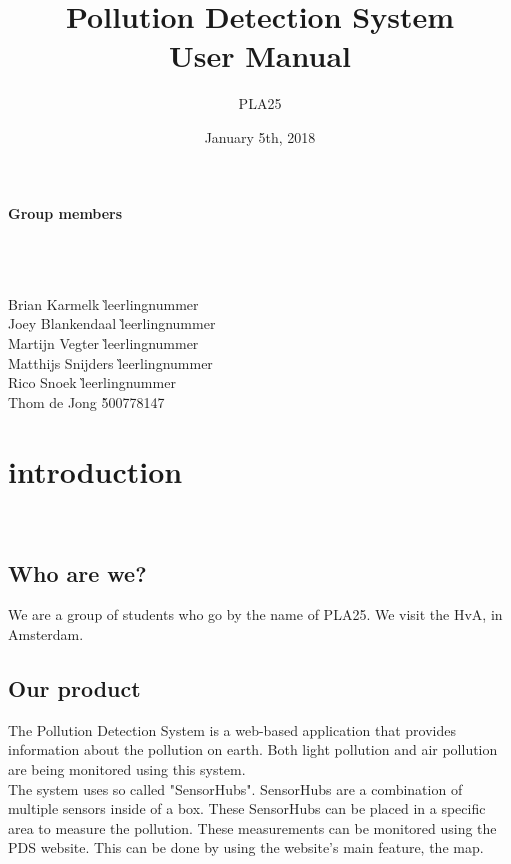 \documentclass[a4paper]{article}
\title{Pollution Detection System\\User Manual}
\author{PLA25}
\date{January 5th, 2018}
\begin{document}
\clearpage
\maketitle
\vspace*{\fill}
\paragraph{Group members}
~\\\\
\begin{tabbing}
Brian Karmelk \` leerlingnummer
\\
Joey Blankendaal \` leerlingnummer
\\
Martijn Vegter \` leerlingnummer
\\
Matthijs Snijders \` leerlingnummer
\\
Rico Snoek \` leerlingnummer
\\
Thom de Jong \` 500778147
\end{tabbing}
\thispagestyle{empty}
\setcounter{page}{0}
\pagebreak
\tableofcontents
\pagebreak

\section{introduction}
~\\

\subsection{Who are we?}
We are a group of students who go by the name of PLA25. We visit the HvA, in Amsterdam.
~\\

\subsection{Our product}
The Pollution Detection System is a web-based application that provides information about the pollution on earth. Both light pollution and air pollution are being monitored using this system.
\\
\indent
The system uses so called "SensorHubs". SensorHubs are a combination of multiple sensors inside of a box. These SensorHubs can be placed in a specific area to measure the pollution. These measurements can be monitored using the PDS website. This can be done by using the website's main feature, the map.

\pagebreak
\end{document}
